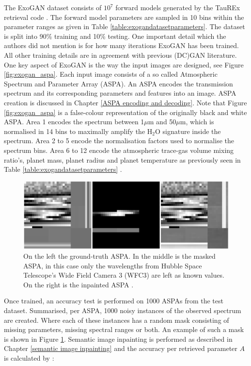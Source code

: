 The ExoGAN dataset consists of $10^7$ forward models generated by the TauREx retrieval code \cite{waldmann2015tau, waldmann2015rex}. The forward model parameters are sampled in 10 bins within the parameter ranges as given in Table \ref{table:exogandatasetparameters}. The dataset is split into 90\% training and 10\% testing. One important detail which the authors did not mention is for how many iterations ExoGAN has been trained. All other training details are in agreement with previous (DC)GAN literature. One key aspect of ExoGAN is the way the input images are designed, see Figure \ref{fig:exogan_aspa}. Each input image consists of a so called Atmospheric Spectrum and Parameter Array (ASPA). An ASPA encodes the transmission spectrum and its corresponding parameters and features into an image. ASPA creation is discussed in Chapter \ref{ASPA encoding and decoding}. Note that Figure \ref{fig:exogan_aspa} is a false-colour representation of the originally black and white ASPA. Area 1 encodes the spectrum between 1$\mu$m and 50$\mu$m, which is normalised in 14 bins to maximally amplify the $\mathrm{H_2O}$ signature inside the spectrum. Area 2 to 5 encode the normalisation factors used to normalise the spectrum bins. Area 6 to 12 encode the atmospheric trace-gas volume mixing ratio's, planet mass, planet radius and planet temperature as previously seen in Table \ref{table:exogandatasetparameters} \cite{zingales2018exogan}.

\begin{figure} [!htb]
    \centering
    \includegraphics[scale=0.3]{figuren/exogan_mask_inpainting.png}
    \caption{On the left the ground-truth ASPA. In the middle is the masked ASPA, in this case only the wavelengths from Hubble Space Telescope's Wide Field Camera 3 (WFC3) are left as known values. On the right is the inpainted ASPA \cite{zingales2018exogan}.}
    \label{fig:exogan_aspa_inpainting}
\end{figure}


Once trained, an accuracy test is performed on 1000 ASPAs from the test dataset. Summarised, per ASPA, 1000 noisy instances of the observed spectrum are created. Where each of these instances has a random mask consisting of missing parameters, missing spectral ranges or both. An example of such a mask is shown in Figure \ref{fig:exogan_aspa_inpainting}. Semantic image inpainting is performed as described in Chapter \ref{semantic image inpainting} and the accuracy per retrieved parameter $A$ is calculated by \cite{zingales2018exogan}:

